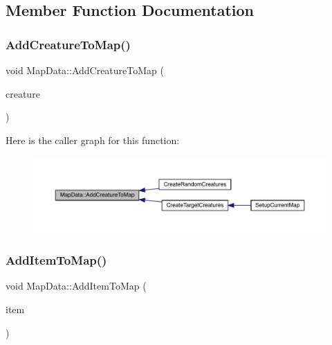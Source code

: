 \subsection{Member Function Documentation}
\mbox{\label{class_map_data_ab54fe2f14d5192d3e1683a6c48839f80}} 
\subsubsection{\texorpdfstring{Add\+Creature\+To\+Map()}{AddCreatureToMap()}}
{\footnotesize\ttfamily void Map\+Data\+::\+Add\+Creature\+To\+Map (\begin{DoxyParamCaption}\item[{\mbox{\hyperlink{class_base_creature}{Base\+Creature}}}]{creature }\end{DoxyParamCaption})}

Here is the caller graph for this function\+:
\nopagebreak
\begin{figure}[H]
\begin{center}
\leavevmode
\includegraphics[width=350pt]{class_map_data_ab54fe2f14d5192d3e1683a6c48839f80_icgraph}
\end{center}
\end{figure}
\mbox{\label{class_map_data_a134c2de11f90b487d30fdae6570bc256}} 
\subsubsection{\texorpdfstring{Add\+Item\+To\+Map()}{AddItemToMap()}\hspace{0.1cm}{\footnotesize\ttfamily [1/2]}}
{\footnotesize\ttfamily void Map\+Data\+::\+Add\+Item\+To\+Map (\begin{DoxyParamCaption}\item[{\mbox{\hyperlink{class_item}{Item}} $\ast$}]{item }\end{DoxyParamCaption})}

